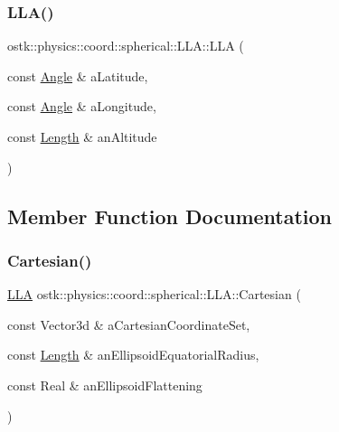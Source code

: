 \subsubsection{\texorpdfstring{L\+L\+A()}{LLA()}}
{\footnotesize\ttfamily ostk\+::physics\+::coord\+::spherical\+::\+L\+L\+A\+::\+L\+LA (\begin{DoxyParamCaption}\item[{const \hyperlink{classostk_1_1physics_1_1units_1_1_angle}{Angle} \&}]{a\+Latitude,  }\item[{const \hyperlink{classostk_1_1physics_1_1units_1_1_angle}{Angle} \&}]{a\+Longitude,  }\item[{const \hyperlink{classostk_1_1physics_1_1units_1_1_length}{Length} \&}]{an\+Altitude }\end{DoxyParamCaption})}



\subsection{Member Function Documentation}
\mbox{\label{classostk_1_1physics_1_1coord_1_1spherical_1_1_l_l_a_a9f28bdd9f66bdb51749fcf592a25507d}} 
\subsubsection{\texorpdfstring{Cartesian()}{Cartesian()}}
{\footnotesize\ttfamily \hyperlink{classostk_1_1physics_1_1coord_1_1spherical_1_1_l_l_a}{L\+LA} ostk\+::physics\+::coord\+::spherical\+::\+L\+L\+A\+::\+Cartesian (\begin{DoxyParamCaption}\item[{const Vector3d \&}]{a\+Cartesian\+Coordinate\+Set,  }\item[{const \hyperlink{classostk_1_1physics_1_1units_1_1_length}{Length} \&}]{an\+Ellipsoid\+Equatorial\+Radius,  }\item[{const Real \&}]{an\+Ellipsoid\+Flattening }\end{DoxyParamCaption})\hspace{0.3cm}{\ttfamily [static]}}

\mbox{\label{classostk_1_1physics_1_1coord_1_1spherical_1_1_l_l_a_a69214fc582c7d81ed8ddfbb28e7392a1}} 
